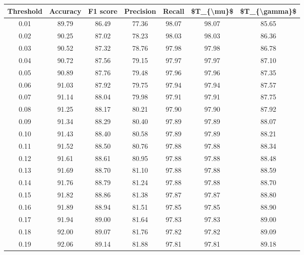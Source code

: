 \begin{tabular}{|c|c|c|c|c|c|c|}
\hline
 Threshold &  Accuracy &  F1 score &  Precision &  Recall &  \$T\_\{\textbackslash mu\}\$ &  \$T\_\{\textbackslash gamma\}\$ \\
\hline
      0.01 &     89.79 &     86.49 &      77.36 &   98.07 &      98.07 &         85.65 \\
      0.02 &     90.25 &     87.02 &      78.23 &   98.03 &      98.03 &         86.36 \\
      0.03 &     90.52 &     87.32 &      78.76 &   97.98 &      97.98 &         86.78 \\
      0.04 &     90.72 &     87.56 &      79.15 &   97.97 &      97.97 &         87.10 \\
      0.05 &     90.89 &     87.76 &      79.48 &   97.96 &      97.96 &         87.35 \\
      0.06 &     91.03 &     87.92 &      79.75 &   97.94 &      97.94 &         87.57 \\
      0.07 &     91.14 &     88.04 &      79.98 &   97.91 &      97.91 &         87.75 \\
      0.08 &     91.25 &     88.17 &      80.21 &   97.90 &      97.90 &         87.92 \\
      0.09 &     91.34 &     88.29 &      80.40 &   97.89 &      97.89 &         88.07 \\
      0.10 &     91.43 &     88.40 &      80.58 &   97.89 &      97.89 &         88.21 \\
      0.11 &     91.52 &     88.50 &      80.76 &   97.88 &      97.88 &         88.34 \\
      0.12 &     91.61 &     88.61 &      80.95 &   97.88 &      97.88 &         88.48 \\
      0.13 &     91.69 &     88.70 &      81.10 &   97.88 &      97.88 &         88.59 \\
      0.14 &     91.76 &     88.79 &      81.24 &   97.88 &      97.88 &         88.70 \\
      0.15 &     91.82 &     88.86 &      81.38 &   97.87 &      97.87 &         88.80 \\
      0.16 &     91.89 &     88.94 &      81.51 &   97.85 &      97.85 &         88.90 \\
      0.17 &     91.94 &     89.00 &      81.64 &   97.83 &      97.83 &         89.00 \\
      0.18 &     92.00 &     89.07 &      81.76 &   97.82 &      97.82 &         89.09 \\
      0.19 &     92.06 &     89.14 &      81.88 &   97.81 &      97.81 &         89.18 \\

\end{tabular}
